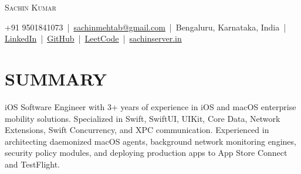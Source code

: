 \documentclass[letterpaper,11pt]{article}
\begin{document}
\begin{center}
{\Huge \scshape Sachin Kumar} \\ \vspace{6pt}

\small 
+91 9501841073 \,|\, 
\href{mailto:sachinmehtab@gmail.com}{sachinmehtab@gmail.com} \,|\, 
Bengaluru, Karnataka, India \,|\, 
\href{https://linkedin.com/in/sachinkumar6174}{LinkedIn} \,|\, 
\href{https://github.com/sachin6174}{GitHub} \,|\, 
\href{https://leetcode.com/u/sachinkumar6174/}{LeetCode} \,|\, 
\href{https://www.sachinserver.in}{sachinserver.in}
\end{center}

\vspace{-2pt}

\section{SUMMARY}
iOS Software Engineer with 3+ years of experience in iOS and macOS enterprise mobility solutions. Specialized in Swift, SwiftUI, UIKit, Core Data, Network Extensions, Swift Concurrency, and XPC communication. Experienced in architecting daemonized macOS agents, background network monitoring engines, security policy modules, and deploying production apps to App Store Connect and TestFlight.

\end{document}

